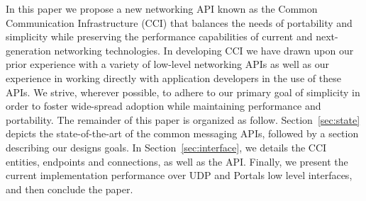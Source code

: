 In this paper we propose a new networking API known as the Common
Communication Infrastructure (CCI) that balances the needs of
portability and simplicity while preserving the performance
capabilities of current and next-generation networking
technologies. In developing CCI we have drawn upon our prior
experience with a variety of low-level networking APIs as well as our
experience in working directly with application developers in the use
of these APIs. We strive, wherever possible, to adhere to our primary
goal of simplicity in order to foster wide-spread adoption while
maintaining performance and portability. The remainder of this paper
is organized as follow.  Section~\ref{sec:state} depicts the
state-of-the-art of the common messaging APIs, followed by a section
describing our designs goals.  In Section~\ref{sec:interface}, we
details the CCI entities, endpoints and connections, as well as the
API. Finally, we present the current implementation performance over
UDP and Portals low level interfaces, and then conclude the paper.


